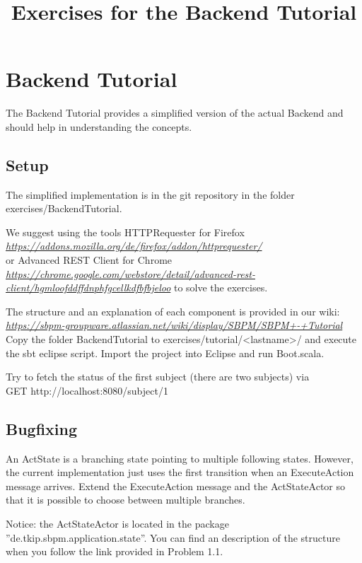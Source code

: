 \documentclass[11pt]{tudexercise}
\title{Exercises for the Backend Tutorial}
\newcommand{\link}[1]{\\ \textcolor{blue}{\textit{\url{#1}}}}
\begin{document}
  \maketitle

\section{Backend Tutorial}
  The Backend Tutorial provides a simplified version of the actual Backend and should help in understanding the concepts.

  \subsection{Setup}
    The simplified implementation is in the git repository in the folder exercises/BackendTutorial.

    We suggest using the tools HTTPRequester for Firefox
    \link{https://addons.mozilla.org/de/firefox/addon/httprequester/}\\
    or Advanced REST Client for Chrome
    \link{https://chrome.google.com/webstore/detail/advanced-rest-client/hgmloofddffdnphfgcellkdfbfbjeloo}
    to solve the exercises.

    The structure and an explanation of each component is provided in our wiki:
    \link{https://sbpm-groupware.atlassian.net/wiki/display/SBPM/SBPM+-+Tutorial}\\

    Copy the folder BackendTutorial to exercises/tutorial/<lastname>/ and execute the sbt eclipse script. Import the project into Eclipse and run Boot.scala.

    Try to fetch the status of the first subject (there are two subjects) via\\ GET http://localhost:8080/subject/1

  \subsection{Bugfixing}
    An ActState is a branching state pointing to multiple following states. However, the current implementation just uses the first transition when an ExecuteAction message arrives. Extend the ExecuteAction message and the ActStateActor so that it is possible to choose between multiple branches.

    Notice: the ActStateActor is located in the package ''de.tkip.sbpm.application.state''. You can find an description of the structure when you follow the link provided in Problem 1.1.
\end{document}
